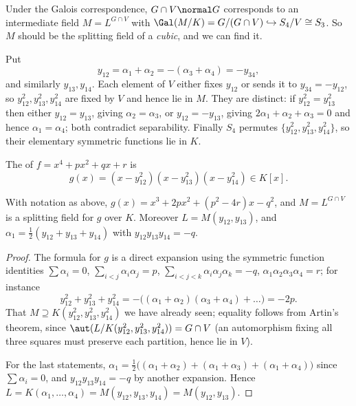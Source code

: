 Under the Galois correspondence, $G \cap V \normal G$ corresponds to an intermediate field $M = L^{G\cap V}$ with $\Gal(M/K) = G/(G\cap V) \hookrightarrow S_4/V \cong S_3$. So $M$ should be the splitting field of a \emph{cubic}, and we can find it.

Put
$$y_{12} = \alpha_1+\alpha_2 = -(\alpha_3+\alpha_4) = -y_{34},$$
and similarly $y_{13}, y_{14}$. Each element of $V$ either fixes $y_{12}$ or sends it to $y_{34} = -y_{12}$, so $y_{12}^2, y_{13}^2, y_{14}^2$ are fixed by $V$ and hence lie in $M$. They are distinct: if $y_{12}^2 = y_{13}^2$ then either $y_{12} = y_{13}$, giving $\alpha_2 = \alpha_3$, or $y_{12} = -y_{13}$, giving $2\alpha_1 + \alpha_2+\alpha_3 = 0$ and hence $\alpha_1 = \alpha_4$; both contradict separability. Finally $S_4$ permutes $\{y_{12}^2, y_{13}^2, y_{14}^2\}$, so their elementary symmetric functions lie in $K$.

\begin{definition}
	The  of $f = x^4+px^2+qx+r$ is
	$$g(x) = (x - y_{12}^2)(x-y_{13}^2)(x-y_{14}^2) \in K[x].$$
\end{definition}

\begin{proposition}
	With notation as above, $g(x) = x^3 + 2px^2 + (p^2-4r)x - q^2$, and $M = L^{G\cap V}$ is a splitting field for $g$ over $K$. Moreover $L = M(y_{12}, y_{13})$, and $\alpha_1 = \tfrac12(y_{12}+y_{13}+y_{14})$ with $y_{12}y_{13}y_{14} = -q$.
\end{proposition}

\begin{proof}
	The formula for $g$ is a direct expansion using the symmetric function identities $\sum\alpha_i = 0$, $\sum_{i<j}\alpha_i\alpha_j = p$, $\sum_{i<j<k}\alpha_i\alpha_j\alpha_k = -q$, $\alpha_1\alpha_2\alpha_3\alpha_4 = r$; for instance
	$$y_{12}^2+y_{13}^2+y_{14}^2 = -\big((\alpha_1+\alpha_2)(\alpha_3+\alpha_4)+\dots\big) = -2p.$$
	That $M \supseteq K(y_{12}^2,y_{13}^2,y_{14}^2)$ we have already seen; equality follows from Artin's theorem, since $\aut(L/K(y_{12}^2,y_{13}^2,y_{14}^2)) = G\cap V$ (an automorphism fixing all three squares must preserve each partition, hence lie in $V$).

	For the last statements, $\alpha_1 = \frac12\big((\alpha_1+\alpha_2)+(\alpha_1+\alpha_3)+(\alpha_1+\alpha_4)\big)$ since $\sum\alpha_i = 0$, and $y_{12}y_{13}y_{14} = -q$ by another expansion. Hence $L = K(\alpha_1,\dots,\alpha_4) = M(y_{12},y_{13},y_{14}) = M(y_{12},y_{13})$.
\end{proof}

